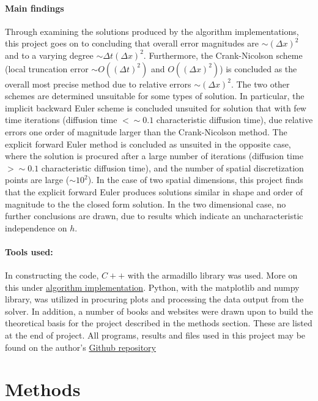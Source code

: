 \documentclass[%
oneside,                 %
final,                   %
10pt]{article}
\begin{document}
\paragraph{Main findings}
Through examining the solutions produced by the algorithm implementations, this project goes on to concluding that overall error magnitudes are $\sim (\Delta x)^2$ and to a varying degree  $\sim \Delta t (\Delta x)^2$. Furthermore, the Crank-Nicolson scheme (local truncation error $\sim O((\Delta t)^2)$ and $O((\Delta x)^2)$) is concluded as the overall most precise method due to relative errors $\sim (\Delta x)^2$.  The two other schemes are determined unsuitable for some types of solution. In particular, the implicit backward Euler scheme is concluded unsuited for solution that with few time iterations (diffusion time $<\sim 0.1$ characteristic diffusion time), due relative errors one order of magnitude larger than the Crank-Nicolson method. The explicit forward Euler method is concluded as unsuited in the opposite case, where the solution is procured after a large number of iterations (diffusion time $>\sim 0.1$ characteristic diffusion time), and the number of spatial discretization points are large ($\sim 10^2$). \newline
In the case of two spatial dimensions, this project finds that the explicit forward Euler produces solutions similar in shape and order of magnitude to the the closed form solution. In the two dimensional case, no further conclusions are drawn, due to results which indicate an uncharacteristic independence on $h$. 
\paragraph{Tools used:} 
In constructing the code, $C++$ with the armadillo library was used. More on this under \hyperref[M.AlgoImpl]{algorithm implementation}. Python, with the matplotlib and numpy library, was utilized in procuring plots and processing the data output from the solver. In addition, a number of books and websites were drawn upon to build the theoretical basis for the project described in the methods section. These are listed at the end of project. All programs, results and files used in this project may be found on the author's \href{https://github.com/johanere/CP5}{Github repository}




\section{Methods}
\end{document}
